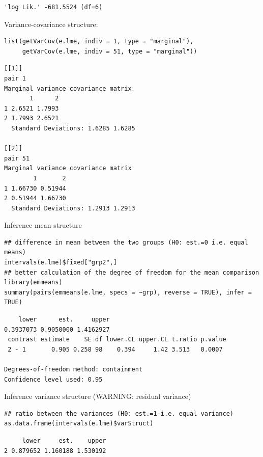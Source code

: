 \documentclass{article}
\begin{document}
\begin{verbatim}
'log Lik.' -681.5524 (df=6)
\end{verbatim}

\clearpage

Variance-covariance structure:
\lstset{language=r,label= ,caption= ,captionpos=b,numbers=none}
\begin{lstlisting}
list(getVarCov(e.lme, indiv = 1, type = "marginal"),
     getVarCov(e.lme, indiv = 51, type = "marginal"))
\end{lstlisting}

\begin{verbatim}
[[1]]
pair 1 
Marginal variance covariance matrix
       1      2
1 2.6521 1.7993
2 1.7993 2.6521
  Standard Deviations: 1.6285 1.6285 

[[2]]
pair 51 
Marginal variance covariance matrix
        1       2
1 1.66730 0.51944
2 0.51944 1.66730
  Standard Deviations: 1.2913 1.2913
\end{verbatim}

Inference mean structure
\lstset{language=r,label= ,caption= ,captionpos=b,numbers=none}
\begin{lstlisting}
## difference in mean between the two groups (H0: est.=0 i.e. equal means)
intervals(e.lme)$fixed["grp2",]
## better calculation of the degree of freedom for the mean comparison
library(emmeans)
summary(pairs(emmeans(e.lme, specs = ~grp), reverse = TRUE), infer = TRUE)
\end{lstlisting}

\begin{verbatim}
    lower      est.     upper 
0.3937073 0.9050000 1.4162927
 contrast estimate    SE df lower.CL upper.CL t.ratio p.value
 2 - 1       0.905 0.258 98    0.394     1.42 3.513   0.0007 

Degrees-of-freedom method: containment 
Confidence level used: 0.95
\end{verbatim}

\clearpage

Inference variance structure (WARNING: residual variance)
\lstset{language=r,label= ,caption= ,captionpos=b,numbers=none}
\begin{lstlisting}
## ratio between the variances (H0: est.=1 i.e. equal variance)
as.data.frame(intervals(e.lme)$varStruct)
\end{lstlisting}

\begin{verbatim}
     lower     est.    upper
2 0.879652 1.160188 1.530192
\end{verbatim}
\end{document}

